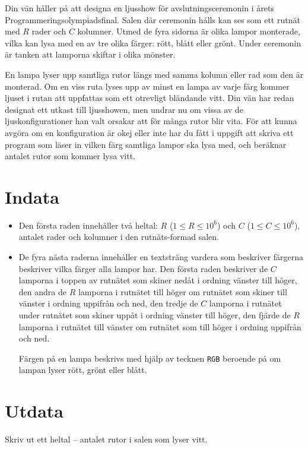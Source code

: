 Din vän håller på att designa en ljusshow för avslutningsceremonin i årets Programmeringsolympiadsfinal.
Salen där ceremonin hålls kan ses som ett rutnät med $R$ rader och $C$ kolumner.
Utmed de fyra sidorna är olika lampor monterade, vilka kan lysa med en av tre olika färger: rött, blått eller grönt.
Under ceremonin är tanken att lamporna skiftar i olika mönster.

En lampa lyser upp samtliga rutor längs med samma kolumn eller rad som den är monterad.
Om en viss ruta lyses upp av minst en lampa av varje färg kommer ljuset i rutan att uppfattas som ett otrevligt bländande vitt.
Din vän har redan designat ett utkast till ljusshowen, men undrar nu om vissa av de ljuskonfigurationer han valt orsakar att för många rutor blir vita.
För att kunna avgöra om en konfiguration är okej eller inte har du fått i uppgift att skriva ett program som läser in vilken färg samtliga lampor ska lysa med, och beräknar antalet rutor som kommer lysa vitt.

\section*{Indata}
\begin{itemize}
  \item
    Den första raden innehåller två heltal: $R$ ($1 \le R \le 10^6$) och $C$ ($1 \le C \le 10^6$), antalet rader och kolumner i den rutnäts-formad salen.

  \item
    De fyra nästa raderna innehåller en textsträng vardera som beskriver färgerna beskriver vilka färger alla lampor har.
    Den första raden beskriver de $C$ lamporna i toppen av rutnätet som skiner nedåt i ordning vänster till höger,
        den andra de $R$ lamporna i rutnätet till höger om rutnätet som skiner till vänster i ordning uppifrån och ned,
        den tredje de $C$ lamporna i rutnätet under rutnätet som skiner uppåt i ordning vänster till höger,
        den fjärde de $R$ lamporna i rutnätet till vänster om rutnätet som till höger i ordning uppifrån och ned.

    Färgen på en lampa beskrivs med hjälp av tecknen \texttt{RGB} beroende på om lampan lyser rött, grönt eller blått.
\end{itemize}

\section*{Utdata}
Skriv ut ett heltal -- antalet rutor i salen som lyser vitt.

